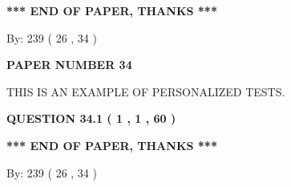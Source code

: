 \documentclass[12pt]{article}
\begin{document}
  
 
 

 
 
   
   
 \vspace{0.2in}
 
   
   
   
   
\vspace{1.0in} 
{\textbf{\large{ *** END OF PAPER, THANKS *** }}} 
   
   
\hspace{1.0in} By: 
         239 (          26 ,           34 )
   
   
   
   
\newpage 
\setcounter{page}{ 
    34001 } 
   
   
   
   
 {\textbf{ \Large{ PAPER NUMBER           34  }}}
   
   
\vspace{0.2in}
   
   
   
   
   
   
 \vspace{0.2in}
{\Huge  THIS IS AN EXAMPLE OF}
{\Huge  PERSONALIZED TESTS. }
   
   
  
\vspace{0.2in}
  
{\textbf{\Large{QUESTION
34.1 
 (           1 ,           1 ,          60 )
}}}
  
  
 
 

 
 
   
   
 \vspace{0.2in}
 
   
   
   
   
\vspace{1.0in} 
{\textbf{\large{ *** END OF PAPER, THANKS *** }}} 
   
   
\hspace{1.0in} By: 
         239 (          26 ,           34 )
   
   
   
\vspace{0.2in}
\vspace{0.2in}
   
\end{document}
